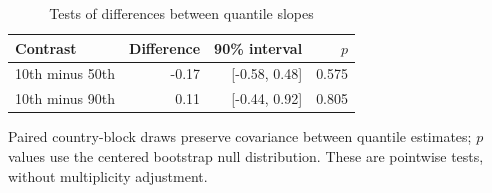 \begin{table}[!htbp]
\centering\small
\caption{Tests of differences between quantile slopes}\label{tab:contrasts}
\begin{tabular}{lrrr}\toprule
Contrast & Difference & 90\% interval & $p$ \\
\midrule
10th minus 50th & -0.17 & [-0.58, 0.48] & 0.575 \\
10th minus 90th & 0.11 & [-0.44, 0.92] & 0.805 \\
\bottomrule\end{tabular}
\par\smallskip\begin{minipage}{0.98\linewidth}\footnotesize Paired country-block draws preserve covariance between quantile estimates; $p$ values use the centered bootstrap null distribution. These are pointwise tests, without multiplicity adjustment.\end{minipage}
\end{table}
